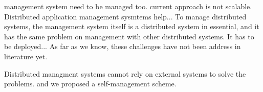 



management system need to be managed too. current approach
is not scalable. 
Distributed application management sysmtems help... To
manage distributed systems, the management system itself is
a distributed system in essential, and it has the same
problem on management with other distributed systems. It has
to be deployed... As far as we know, these challenges have
not been address in literature yet.

Distributed managment systems cannot rely on external
systems to solve the problems. and we proposed a
self-management scheme.











